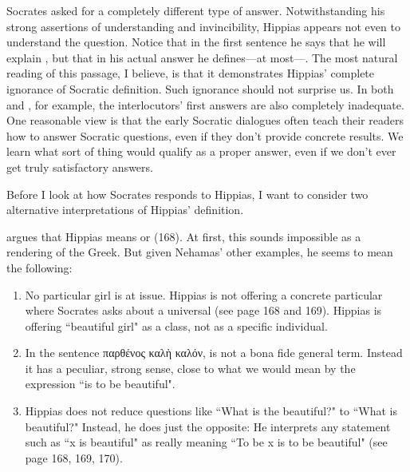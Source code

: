 \documentclass[11pt]{article}
\begin{document}
Socrates asked for a completely different type of answer.  Notwithstanding his
strong assertions of understanding and invincibility, Hippias appears not even
to understand the question.  Notice that in the first sentence he says that he
will explain , but that in his actual answer he defines---at
most---.  The most natural reading of this passage,
I believe, is that it demonstrates Hippias' complete ignorance of Socratic
definition.  Such ignorance should not surprise us.  In both 
and , for example, the interlocutors' first answers are also
completely inadequate.  One reasonable view is that the early Socratic
dialogues often teach their readers how to answer Socratic questions, even if
they don't provide concrete results.  We learn what sort of thing would qualify
as a proper answer, even if we don't ever get truly satisfactory answers.

Before I look at how Socrates responds to Hippias, I want to consider two
alternative interpretations of Hippias' definition.

\citet{nehamas1975a} argues that Hippias means  or  (168).  At first, this sounds impossible as a rendering of the
Greek.  But given Nehamas' other examples, he seems to mean the following:

\begin{enumerate}

    \item No particular girl is at issue.  Hippias is not offering a concrete
        particular where Socrates asks about a universal (see page 168 and
        169).  Hippias is offering ``beautiful girl" as a class, not as
        a specific individual.

    \item In the sentence {\g παρθένος καλὴ καλόν},  is not
        a bona fide general term. Instead it has a peculiar, strong sense,
        close to what we would mean by the expression ``is to be beautiful".

    \item Hippias does not reduce questions like ``What is the beautiful?" to
        ``What is beautiful?"  Instead, he does just the opposite: He
        interprets any statement such as ``x is beautiful" as really meaning
        ``To be x is to be beautiful" (see page 168, 169, 170).

\end{enumerate}
\end{document}
